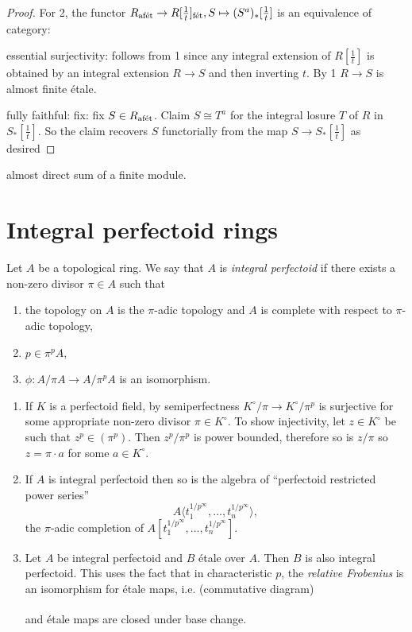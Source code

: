 \documentclass[a4paper]{article}
\begin{document}
\begin{proof}
  For 2, the functor \(R_{\textup{afét}} \to R[\frac{1}{t}]_{\textup{fét}}, S \mapsto (S^a)_*[\frac{1}{t}]\) is an equivalence of category:

  essential surjectivity: follows from 1 since any integral extension of \(R[\frac{1}{t}]\) is obtained by an integral extension \(R \to S\) and then inverting \(t\). By 1 \(R \to S\) is almost finite étale.

  fully faithful: fix: fix \(S \in  R_{\textup{afét}}\). Claim \(S \cong T^a\) for the integral losure \(T\) of \(R\) in \(S_*[\frac{1}{t}]\). So the claim recovers \(S\) functorially from the map \(S \to S_*[\frac{1}{t}]\) as desired
\end{proof}

almost direct sum of a finite module.

\section{Integral perfectoid rings}

\begin{definition}
  Let \(A\) be a topological ring. We say that \(A\) is \emph{integral perfectoid} if there exists a non-zero divisor \(\pi \in A\) such that
  \begin{enumerate}
  \item the topology on \(A\) is the \(\pi\)-adic topology and \(A\) is complete with respect to \(\pi\)-adic topology,
  \item \(p \in \pi^p A\),
  \item \(\phi: A/\pi A \to A/\pi^pA\) is an isomorphism. 
  \end{enumerate}
\end{definition}

\begin{eg}\leavevmode
  \begin{enumerate}
  \item If \(K\) is a perfectoid field, by semiperfectness \(K^\circ/\pi \to K^\circ/\pi^p\) is surjective for some appropriate non-zero divisor \(\pi \in K^\circ\). To show injectivity, let \(z \in K^\circ\) be such that \(z^p \in (\pi^p)\). Then \(z^p/\pi^p\) is power bounded, therefore so is \(z/\pi\) so \(z = \pi \cdot a\) for some \(a \in K^\circ\).
  \item If \(A\) is integral perfectoid then so is the algebra of ``perfectoid restricted power series''
    \[
      A \langle t_1^{1/p^\infty}, \dots, t_n^{1/p^\infty} \rangle,
    \]
    the \(\pi\)-adic completion of \(A[t_1^{1/p^\infty}, \dots, t_n^{1/p^\infty}]\).
  \item Let \(A\) be integral perfectoid and \(B\) étale over \(A\). Then \(B\) is also integral perfectoid. This uses the fact that in characteristic \(p\), the \emph{relative Frobenius} is an isomorphism for étale maps, i.e. (commutative diagram)
    \[
      \begin{tikzcd}
      \end{tikzcd}
    \]
    and étale maps are closed under base change.
  \end{enumerate}
\end{eg}
\end{document}
